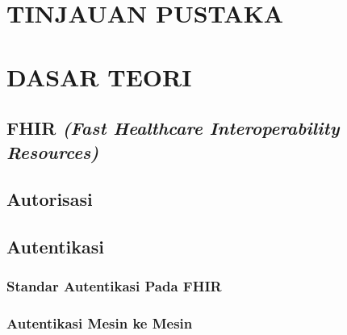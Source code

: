 \documentclass[ugmtesis]{ugmtesis}
\begin{document}


\chapter{TINJAUAN PUSTAKA}
\label{TINJAUAN PUSTAKA}




\chapter{DASAR TEORI}
\label{DASAR TEORI}

	\section{FHIR \textit{(Fast Healthcare Interoperability Resources)}}
	\label{dasar teori fhir}
	

	\section{Autorisasi}
	\label{Autorisasi}
	

	\section{Autentikasi}
	\label{Autentikasi}
	
		\subsection{Standar Autentikasi Pada FHIR}
		\label{standar autentikasi pada fhir}
		


		\subsection{Autentikasi Mesin ke Mesin}
		\label{autentikasi mesin ke mesin}
		
\end{document}
